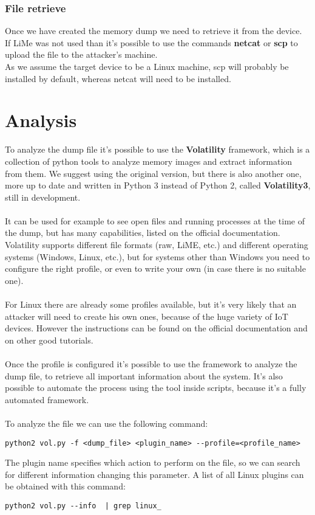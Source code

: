 \subsubsection{File retrieve}
Once we have created the memory dump we need to retrieve it from the device.\\
If LiMe was not used than it's possible to use the commands \textbf{netcat}\cite{netcat} or \textbf{scp}\cite{scp}
to upload the file to the attacker's machine.\\
As we assume the target device to be a Linux machine, scp will probably be installed
by default, whereas netcat will need to be installed.
\section{Analysis}
To analyze the dump file it's possible to use the \textbf{Volatility}\cite{volatility} framework, which is a collection
of python tools to analyze memory images and extract information from them.
We suggest using the original version, but there is also another one, more up
to date and written in Python 3 instead of Python 2, called \textbf{Volatility3}\cite{volatility3},
still in development.\\\\
It can be used for example to see open files and running processes at the time of the dump, but
has many capabilities, listed on the official documentation. Volatility supports
different file formats (raw, LiME, etc.) and different operating systems (Windows, Linux, etc.),
but for systems other than Windows you need to configure the right profile,
or even to write your own (in case there is no suitable one).\\\\
For Linux there are already some profiles available, but it's very likely that
an attacker will need to create his own ones, because of the huge variety of 
IoT devices. However the instructions can be found on the official documentation
and on other good tutorials\cite{volatility-conf}\cite{volatility-tutorial}.\\\\
Once the profile is configured it's possible to use the framework to analyze the dump file, to
retrieve all important information about the system. It's also possible to 
automate the process using the tool inside scripts, because it's a fully automated
framework.\\\\
To analyze the file we can use the following command:
\begin{lstlisting}[numbers=none]
    python2 vol.py -f <dump_file> <plugin_name> --profile=<profile_name>
\end{lstlisting}
The plugin name specifies which action to perform on the file, so we can
search for different information changing this parameter. A list of all Linux plugins can be
obtained with this command:
\begin{lstlisting}[numbers=none]
    python2 vol.py --info  | grep linux_
\end{lstlisting}
\newpage